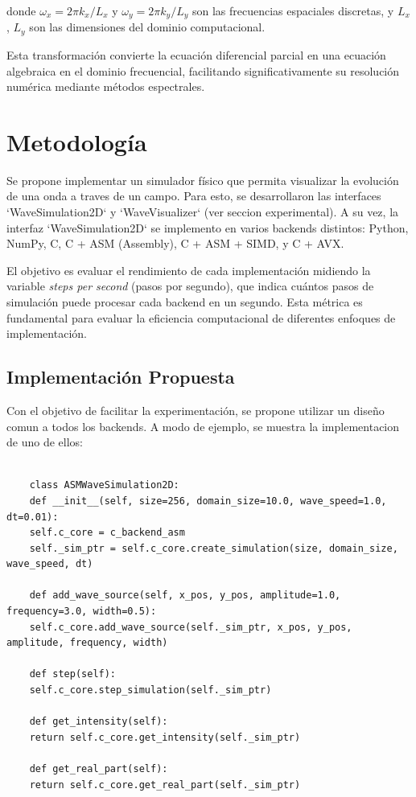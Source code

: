 \documentclass[a4paper]{article}
\begin{document}
donde $\omega_x = 2\pi k_x/L_x$ y $\omega_y = 2\pi k_y/L_y$ son las frecuencias espaciales discretas, y $L_x$, $L_y$ son las
dimensiones del dominio computacional.

Esta transformación convierte la ecuación diferencial parcial en una ecuación algebraica en el dominio frecuencial, facilitando
significativamente su resolución numérica mediante métodos espectrales.

\section{Metodología}
Se propone implementar un simulador físico que permita visualizar la evolución de una onda a traves de un campo. Para esto, se desarrollaron
las interfaces `WaveSimulation2D` y `WaveVisualizer` (ver seccion experimental). A su vez, la interfaz `WaveSimulation2D` se implemento en varios
backends distintos: Python, NumPy, C, C + ASM (Assembly), C + ASM + SIMD, y C + AVX.

El objetivo es evaluar el rendimiento de cada implementación midiendo la variable \textit{steps per second} (pasos por segundo), que
indica cuántos pasos de simulación puede procesar cada backend en un segundo. Esta métrica es fundamental para evaluar la eficiencia
computacional de diferentes enfoques de implementación.

\subsection{Implementación Propuesta}
Con el objetivo de facilitar la experimentación, se propone utilizar un diseño comun a todos los backends. A modo de ejemplo, se muestra
la implementacion de uno de ellos:

\begin{verbatim}
    
    class ASMWaveSimulation2D:
    def __init__(self, size=256, domain_size=10.0, wave_speed=1.0, dt=0.01):
    self.c_core = c_backend_asm
    self._sim_ptr = self.c_core.create_simulation(size, domain_size, wave_speed, dt)
    
    def add_wave_source(self, x_pos, y_pos, amplitude=1.0, frequency=3.0, width=0.5):
    self.c_core.add_wave_source(self._sim_ptr, x_pos, y_pos, amplitude, frequency, width)
    
    def step(self):
    self.c_core.step_simulation(self._sim_ptr)
    
    def get_intensity(self):
    return self.c_core.get_intensity(self._sim_ptr)
    
    def get_real_part(self):
    return self.c_core.get_real_part(self._sim_ptr)
\end{verbatim}
\end{document}

